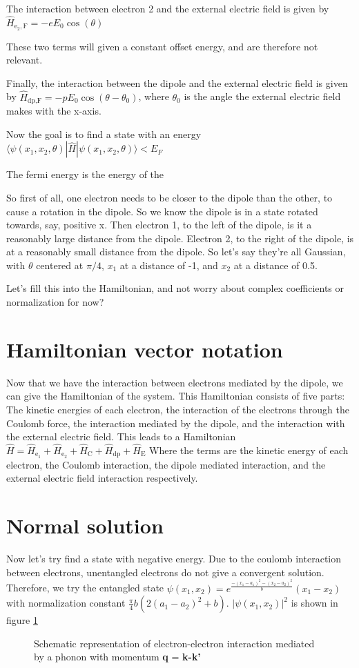 The interaction between electron 2 and the external electric field is given by $\hat{H}_{\text{e}_2 , \text{F}} = -e E_0 \cos(\theta)$

These two terms will given a constant offset energy, and are therefore not relevant.

Finally, the interaction between the dipole and the external electric field is given by $\hat{H}_{\text{dp} , \text{F}} = -p E_0 \cos(\theta - \theta_0)$, where $\theta_0$ is the angle the external electric field makes with the x-axis.

Now the goal is to find a state with an energy $\langle{\psi(x_1, x_2, \theta)|\hat{H}|\psi(x_1, x_2, \theta)}\rangle < E_F$

The fermi energy is the energy of the

So first of all, one electron needs to be closer to the dipole than the other, to cause a rotation in the dipole. So we know the dipole is in a state rotated towards, say, positive x. Then electron 1, to the left of the dipole, is it a reasonably large distance from the dipole. Electron 2, to the right of the dipole, is at a reasonably small distance from the dipole. So let's say they're all Gaussian, with $\theta$ centered at $\pi / 4$, $x_1$ at a distance of -1, and $x_2$ at a distance of 0.5.

Let's fill this into the Hamiltonian, and not worry about complex coefficients or normalization for now?

\section{Hamiltonian vector notation}
Now that we have the interaction between electrons mediated by the dipole, we can give the Hamiltonian of the system. This Hamiltonian consists of five parts: The kinetic energies of each electron, the interaction of the electrons through the Coulomb force, the interaction mediated by the dipole, and the interaction with the external electric field. This leads to a Hamiltonian $\hat{H} = \hat{H}_{\text{e}_1} + \hat{H}_{\text{e}_2} + \hat{H}_{\text{C}} + \hat{H}_{\text{dp}} + \hat{H}_\text{E}$
Where the terms are the kinetic energy of each electron, the Coulomb interaction, the dipole mediated interaction, and the external electric field interaction respectively.  

\section{Normal solution}
Now let's try find a state with negative energy. Due to the coulomb interaction between electrons, unentangled electrons do not give a convergent solution. Therefore, we try the entangled state $\psi(x_1, x_2) = e^\frac{-(x_1-a_1)^2-(x_2-a_2)^2}{b}(x_1-x_2)$ with normalization constant $\frac{\pi}{4}b(2(a_1-a_2)^2 + b)$. $|\psi(x_1, x_2)|^2$ is shown in figure \ref{fig:phi_squared}
\begin{figure}[h]
    \centering
    
    \caption{Schematic representation of electron-electron interaction mediated by a phonon with momentum \textbf{q} = \textbf{k-k'}}
    \label{fig:phi_squared}
\end{figure} 

